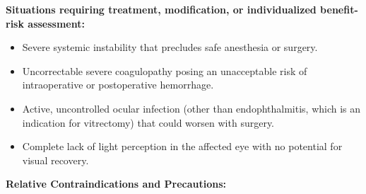 \textbf{Situations requiring treatment, modification, or individualized benefit-risk assessment:}

\begin{itemize}
  \item Severe systemic instability that precludes safe anesthesia or surgery.
  \item Uncorrectable severe coagulopathy posing an unacceptable risk of intraoperative or postoperative hemorrhage.
  \item Active, uncontrolled ocular infection (other than endophthalmitis, which is an indication for vitrectomy) that could worsen with surgery.
  \item Complete lack of light perception in the affected eye with no potential for visual recovery.
\end{itemize}

\textbf{Relative Contraindications and Precautions:}

